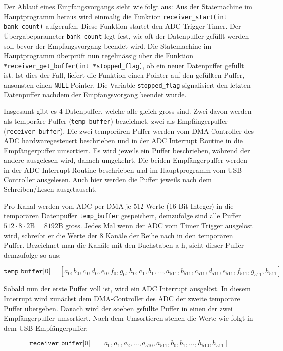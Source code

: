 Der Ablauf eines Empfangsvorgangs sieht wie folgt aus: Aus der Statemachine im Hauptprogramm heraus wird einmalig die Funktion \texttt{receiver\_start(int bank\_count)} aufgerufen. Diese Funktion startet den ADC Trigger Timer. Der Übergabeparameter \texttt{bank\_count} legt fest, wie oft der Datenpuffer gefüllt werden soll bevor der Empfangsvorgang beendet wird. Die Statemachine im Hauptprogramm überprüft nun regelmässig über die Funktion \texttt{*receiver\_get\_buffer(int *stopped\_flag)}, ob ein neuer Datenpuffer gefüllt ist. Ist dies der Fall, liefert die Funktion einen Pointer auf den gefüllten Puffer, ansonsten einen \texttt{NULL}-Pointer. Die Variable \texttt{stopped\_flag} signalisiert den letzten Datenpuffer nachdem der Empfangsvorgang beendet wurde.

Insgesamt gibt es 4 Datenpuffer, welche alle gleich gross sind. Zwei davon werden als temporäre Puffer (\texttt{temp\_buffer}) bezeichnet, zwei als Empfängerpuffer (\texttt{receiver\_buffer}). Die zwei temporären Puffer werden vom DMA-Controller des ADC hardwaregesteuert beschrieben und in der ADC Interrupt Routine in die Empfängerpuffer umsortiert. Es wird jeweils ein Puffer beschrieben, während der andere ausgelesen wird, danach umgekehrt. Die beiden Empfängerpuffer werden in der ADC Interrupt Routine beschrieben und im Hauptprogramm vom USB-Controller ausgelesen. Auch hier werden die Puffer jeweils nach dem Schreiben/Lesen ausgetauscht.

Pro Kanal werden vom ADC per DMA je 512 Werte (16-Bit Integer) in die temporären Datenpuffer \texttt{temp\_buffer} gespeichert, demzufolge sind alle Puffer $512 \cdot 8 \cdot 2 \mathrm{B} = 8192 \mathrm{B}$ gross. Jedes Mal wenn der ADC vom Timer Trigger ausgelöst wird, schreibt er die Werte der 8 Kanäle der Reihe nach in den temporären Puffer. Bezeichnet man die Kanäle mit den Buchstaben a-h, sieht dieser Puffer demzufolge so aus:

$$\texttt{temp\_buffer[0]} = [a_{0}, b_{0}, c_{0}, d_{0}, e_{0}, f_{0}, g_{0}, h_{0}, a_{1}, b_{1}, \dots, a_{511}, b_{511}, c_{511}, d_{511}, e_{511}, f_{511}, g_{511}, h_{511}]$$

Sobald nun der erste Puffer voll ist, wird ein ADC Interrupt ausgelöst. In diesem Interrupt wird zunächst dem DMA-Controller des ADC der zweite temporäre Puffer übergeben. Danach wird der soeben gefüllte Puffer in einen der zwei Empfängerpuffer umsortiert. Nach dem Umsortieren stehen die Werte wie folgt in dem USB Empfängerpuffer:

$$\texttt{receiver\_buffer[0]} = [a_{0}, a_{1}, a_{2}, \dots, a_{510}, a_{511}, b_{0}, b_{1}, \dots, h_{510}, h_{511}]$$


